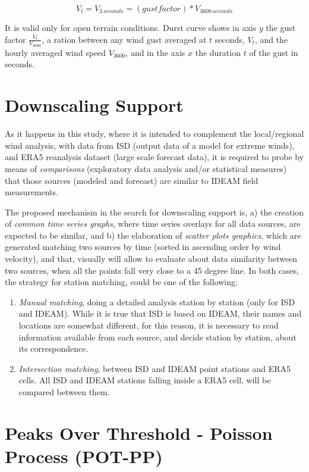 \documentclass[12pt,oneside]{reedthesis}
\begin{document}
\[
V_t = V_{3\,seconds} = (gust factor) * V_{3600\,seconds}
\]

It is valid only for open terrain conditions. Durst curve shows in axis \(y\) the gust factor \(\frac{V_t}{V_{3600}}\), a ration between any wind gust averaged at \(t\) seconds, \(V_t\), and the hourly averaged wind speed \(V_{3600}\), and in the axis \(x\) the duration \(t\) of the gust in seconds.

\hypertarget{ds}{%
\section{Downscaling Support}\label{ds}}

As it happens in this study, where it is intended to complement the local/regional wind analysis, with data from ISD (output data of a model for extreme winds), and ERA5 reanalysis dataset (large scale forecast data), it is required to probe by means of \emph{comparisons} (exploratory data analysis and/or statistical measures) that those sources (modeled and forecast) are similar to IDEAM field measurements.

The proposed mechanism in the search for downscaling support is, a) the creation of \emph{common time series graphs}, where time series overlays for all data sources, are expected to be similar, and b) the elaboration of \emph{scatter plots graphics}, which are generated matching two sources by time (sorted in ascending order by wind velocity), and that, visually will allow to evaluate about data similarity between two sources, when all the points fall very close to a 45 degree line. In both cases, the strategy for station matching, could be one of the following:
\begin{enumerate}
\def\labelenumi{\arabic{enumi}.}
\item
  \emph{Manual matching}, doing a detailed analysis station by station (only for ISD and IDEAM). While it is true that ISD is based on IDEAM, their names and locations are somewhat different, for this reason, it is necessary to read information available from each source, and decide station by station, about its correspondence.
\item
  \emph{Intersection matching}, between ISD and IDEAM point stations and ERA5 cells. All ISD and IDEAM stations falling inside a ERA5 cell, will be compared between them.
\end{enumerate}
\hypertarget{pot-pp}{%
\section{Peaks Over Threshold - Poisson Process (POT-PP)}\label{pot-pp}}
\end{document}
